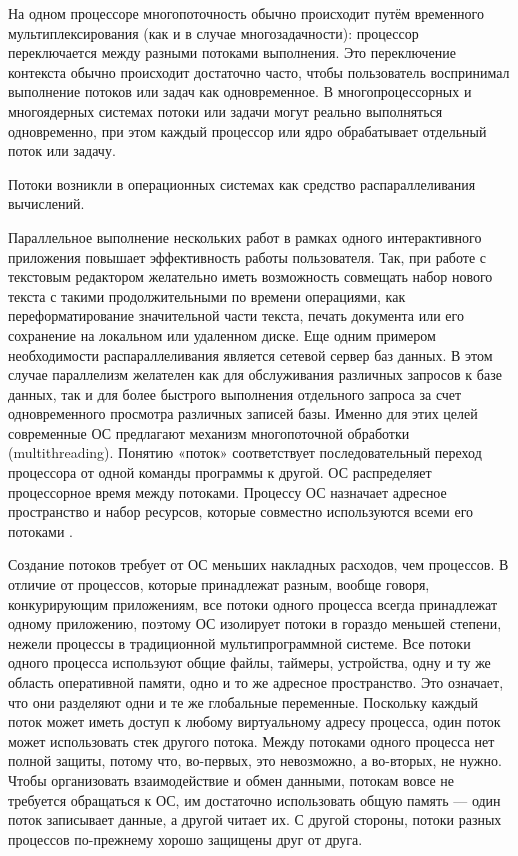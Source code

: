 \documentclass[a4paper, 14pt]{article}
\begin{document}
На одном процессоре многопоточность обычно происходит путём временного мультиплексирования (как и в случае многозадачности): процессор переключается между разными потоками выполнения. Это переключение контекста обычно происходит достаточно часто, чтобы пользователь воспринимал выполнение потоков или задач как одновременное. В многопроцессорных и многоядерных системах потоки или задачи могут реально выполняться одновременно, при этом каждый процессор или ядро обрабатывает отдельный поток или задачу.

Потоки возникли в операционных системах как средство распараллеливания вычислений.

Параллельное выполнение нескольких работ в рамках одного интерактивного приложения повышает эффективность работы пользователя. Так, при работе с текстовым редактором желательно иметь возможность совмещать набор нового текста с такими продолжительными по времени операциями, как переформатирование значительной части текста, печать документа или его сохранение на локальном или удаленном диске. Еще одним примером необходимости распараллеливания является сетевой сервер баз данных. В этом случае параллелизм желателен как для обслуживания различных запросов к базе данных, так и для более быстрого выполнения отдельного запроса за счет одновременного просмотра различных записей базы. Именно для этих целей современные ОС предлагают механизм многопоточной обработки (multithreading). Понятию «поток» соответствует последовательный переход процессора от одной команды программы к другой. ОС распределяет процессорное время между потоками. Процессу ОС назначает адресное пространство и набор ресурсов, которые совместно используются всеми его потоками \cite{multithreading_history}.

Создание потоков требует от ОС меньших накладных расходов, чем процессов. В отличие от процессов, которые принадлежат разным, вообще говоря, конкурирующим приложениям, все потоки одного процесса всегда принадлежат одному приложению, поэтому ОС изолирует потоки в гораздо меньшей степени, нежели процессы в традиционной мультипрограммной системе. Все потоки одного процесса используют общие файлы, таймеры, устройства, одну и ту же область оперативной памяти, одно и то же адресное пространство. Это означает, что они разделяют одни и те же глобальные переменные. Поскольку каждый поток может иметь доступ к любому виртуальному адресу процесса, один поток может использовать стек другого потока. Между потоками одного процесса нет полной защиты, потому что, во-первых, это невозможно, а во-вторых, не нужно. Чтобы организовать взаимодействие и обмен данными, потокам вовсе не требуется обращаться к ОС, им достаточно использовать общую память — один поток записывает данные, а другой читает их. С другой стороны, потоки разных процессов по-прежнему хорошо защищены друг от друга.
\end{document}
